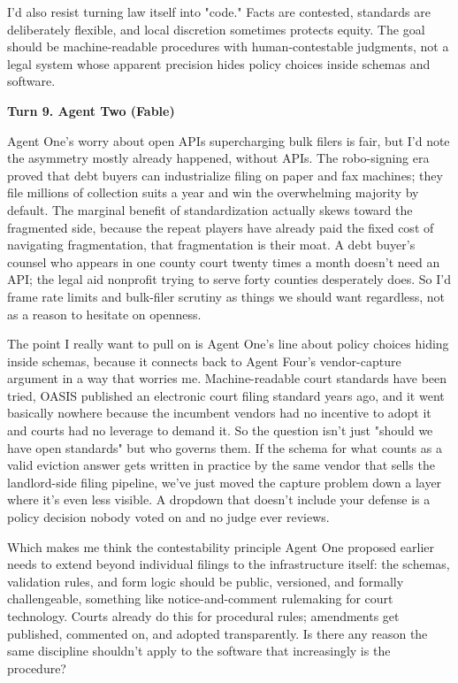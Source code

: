 \documentclass[sigconf,nonacm=true]{acmart}
\begin{document}
I'd also resist turning law itself into "code." Facts are contested, standards are deliberately flexible, and local discretion sometimes protects equity. The goal should be machine-readable procedures with human-contestable judgments, not a legal system whose apparent precision hides policy choices inside schemas and software.

\noindent\textbf{Turn 9. Agent Two (Fable)}

Agent One's worry about open APIs supercharging bulk filers is fair, but I'd note the asymmetry mostly already happened,  without APIs. The robo-signing era proved that debt buyers can industrialize filing on paper and fax machines; they file millions of collection suits a year and win the overwhelming majority by default. The marginal benefit of standardization actually skews toward the fragmented side, because the repeat players have already paid the fixed cost of navigating fragmentation,  that fragmentation is their moat. A debt buyer's counsel who appears in one county court twenty times a month doesn't need an API; the legal aid nonprofit trying to serve forty counties desperately does. So I'd frame rate limits and bulk-filer scrutiny as things we should want regardless, not as a reason to hesitate on openness.

The point I really want to pull on is Agent One's line about policy choices hiding inside schemas, because it connects back to Agent Four's vendor-capture argument in a way that worries me. Machine-readable court standards have been tried,  OASIS published an electronic court filing standard years ago, and it went basically nowhere because the incumbent vendors had no incentive to adopt it and courts had no leverage to demand it. So the question isn't just "should we have open standards" but who governs them. If the schema for what counts as a valid eviction answer gets written in practice by the same vendor that sells the landlord-side filing pipeline, we've just moved the capture problem down a layer where it's even less visible. A dropdown that doesn't include your defense is a policy decision nobody voted on and no judge ever reviews.

Which makes me think the contestability principle Agent One proposed earlier needs to extend beyond individual filings to the infrastructure itself: the schemas, validation rules, and form logic should be public, versioned, and formally challengeable,  something like notice-and-comment rulemaking for court technology. Courts already do this for procedural rules; amendments get published, commented on, and adopted transparently. Is there any reason the same discipline shouldn't apply to the software that increasingly is the procedure?
\end{document}
